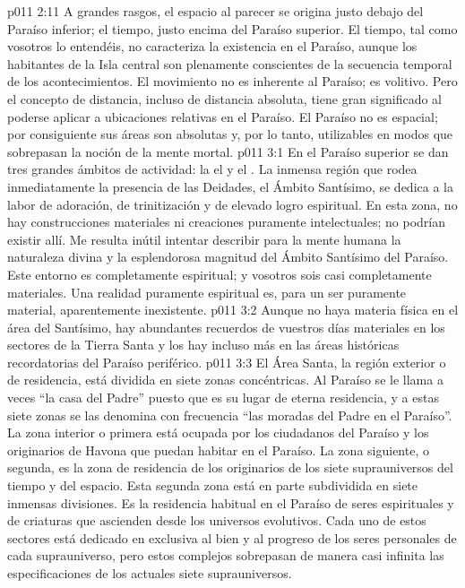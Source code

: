 \vs p011 2:11 A grandes rasgos, el espacio al parecer se origina justo debajo del Paraíso inferior; el tiempo, justo encima del Paraíso superior. El tiempo, tal como vosotros lo entendéis, no caracteriza la existencia en el Paraíso, aunque los habitantes de la Isla central son plenamente conscientes de la secuencia temporal de los acontecimientos. El movimiento no es inherente al Paraíso; es volitivo. Pero el concepto de distancia, incluso de distancia absoluta, tiene gran significado al poderse aplicar a ubicaciones relativas en el Paraíso. El Paraíso no es espacial; por consiguiente sus áreas son absolutas y, por lo tanto, utilizables en modos que sobrepasan la noción de la mente mortal.
\vs p011 3:1 En el Paraíso superior se dan tres grandes ámbitos de actividad: la  el  y el . La inmensa región que rodea inmediatamente la presencia de las Deidades, el Ámbito Santísimo, se dedica a la labor de adoración, de trinitización y de elevado logro espiritual. En esta zona, no hay construcciones materiales ni creaciones puramente intelectuales; no podrían existir allí. Me resulta inútil intentar describir para la mente humana la naturaleza divina y la esplendorosa magnitud del Ámbito Santísimo del Paraíso. Este entorno es completamente espiritual; y vosotros sois casi completamente materiales. Una realidad puramente espiritual es, para un ser puramente material, aparentemente inexistente.
\vs p011 3:2 Aunque no haya materia física en el área del Santísimo, hay abundantes recuerdos de vuestros días materiales en los sectores de la Tierra Santa y los hay incluso más en las áreas históricas recordatorias del Paraíso periférico.
\vs p011 3:3 El Área Santa, la región exterior o de residencia, está dividida en siete zonas concéntricas. Al Paraíso se le llama a veces “la casa del Padre” puesto que es su lugar de eterna residencia, y a estas siete zonas se las denomina con frecuencia “las moradas del Padre en el Paraíso”. La zona interior o primera está ocupada por los ciudadanos del Paraíso y los originarios de Havona que puedan habitar en el Paraíso. La zona siguiente, o segunda, es la zona de residencia de los originarios de los siete suprauniversos del tiempo y del espacio. Esta segunda zona está en parte subdividida en siete inmensas divisiones. Es la residencia habitual en el Paraíso de seres espirituales y de criaturas que ascienden desde los universos evolutivos. Cada uno de estos sectores está dedicado en exclusiva al bien y al progreso de los seres personales de cada suprauniverso, pero estos complejos sobrepasan de manera casi infinita las especificaciones de los actuales siete suprauniversos.
